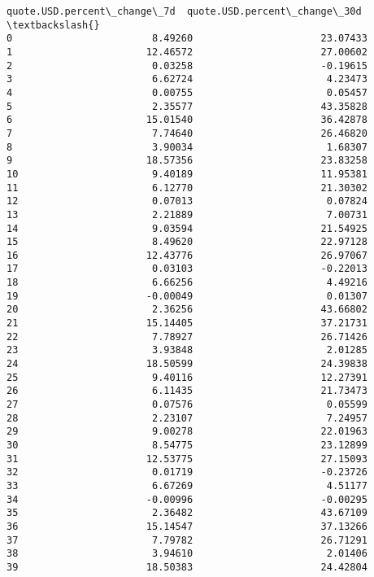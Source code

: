 \documentclass[11pt]{article}
\begin{document}
\begin{tcolorbox}[breakable, size=fbox, boxrule=.5pt, pad at break*=1mm, opacityfill=0]
\begin{Verbatim}[commandchars=\\\{\}]
     quote.USD.percent\_change\_7d  quote.USD.percent\_change\_30d  \textbackslash{}
0                        8.49260                      23.07433
1                       12.46572                      27.00602
2                        0.03258                      -0.19615
3                        6.62724                       4.23473
4                        0.00755                       0.05457
5                        2.35577                      43.35828
6                       15.01540                      36.42878
7                        7.74640                      26.46820
8                        3.90034                       1.68307
9                       18.57356                      23.83258
10                       9.40189                      11.95381
11                       6.12770                      21.30302
12                       0.07013                       0.07824
13                       2.21889                       7.00731
14                       9.03594                      21.54925
15                       8.49620                      22.97128
16                      12.43776                      26.97067
17                       0.03103                      -0.22013
18                       6.66256                       4.49216
19                      -0.00049                       0.01307
20                       2.36256                      43.66802
21                      15.14405                      37.21731
22                       7.78927                      26.71426
23                       3.93848                       2.01285
24                      18.50599                      24.39838
25                       9.40116                      12.27391
26                       6.11435                      21.73473
27                       0.07576                       0.05599
28                       2.23107                       7.24957
29                       9.00278                      22.01963
30                       8.54775                      23.12899
31                      12.53775                      27.15093
32                       0.01719                      -0.23726
33                       6.67269                       4.51177
34                      -0.00996                      -0.00295
35                       2.36482                      43.67109
36                      15.14547                      37.13266
37                       7.79782                      26.71291
38                       3.94610                       2.01406
39                      18.50383                      24.42804

\end{Verbatim}
\end{tcolorbox}
\end{document}
